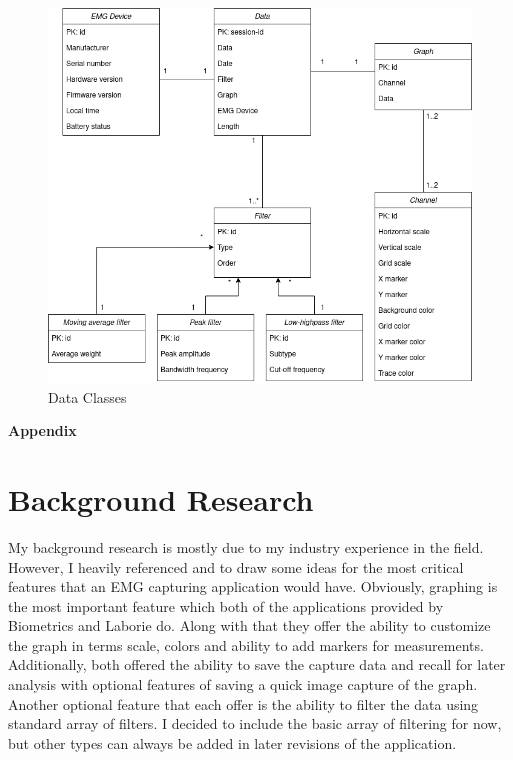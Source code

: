 \documentclass[12pt,a4paper]{article}
\begin{document}
\begin{figure}[h]
	\centering
	\includegraphics[scale=0.50]{Project Data Classes.png}
	\caption{Data Classes}
	\label{Data Classes}
\end{figure}

\newpage

\begin{flushleft}
\textbf{{\Large Appendix}}
\end{flushleft}
\appendix
\section{Background Research}

My background research is mostly due to my industry experience in the field. However, I heavily referenced \cite{Biometrics} and \cite{Laborie}
to draw some ideas for the most critical features that an EMG capturing application would have. Obviously, graphing is the most important feature
which both of the applications provided by Biometrics and Laborie do. Along with that they offer the ability to customize the graph in terms scale,
colors and ability to add markers for measurements. Additionally, both offered the ability to save the capture data and recall for later analysis 
with optional features of saving a quick image capture of the graph. Another optional feature that each offer is the ability to filter the data using
standard array of filters. I decided to include the basic array of filtering for now, but other types can always be added in later revisions of the application. 
\end{document}
